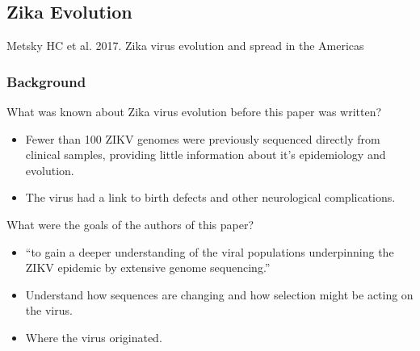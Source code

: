 \documentclass[12pt,a4paper]{article}
\begin{document}
\subsection{Zika Evolution}
{\color{darklc} Metsky HC et al. 2017. Zika virus evolution and spread in the Americas}
\vspace*{-12pt}
\subsubsection{Background}
\begin{itemize}
    {\color{G-Moon}\item What was known about Zika virus evolution before this paper was written?}
        \begin{itemize}
            \item Fewer than 100 ZIKV genomes were previously sequenced directly from clinical samples, providing little information about it's epidemiology and evolution.
            \item The virus had a link to birth defects and other neurological complications.
        \end{itemize}
    {\color{G-Moon}\item What were the goals of the authors of this paper?}
        \begin{itemize}
            \item ``to gain a deeper understanding of the viral populations underpinning the ZIKV epidemic by extensive genome sequencing.''
            \item Understand how sequences are changing and how selection might be acting on the virus.
            \item Where the virus originated.
        \end{itemize}
\end{itemize}
\end{document}
